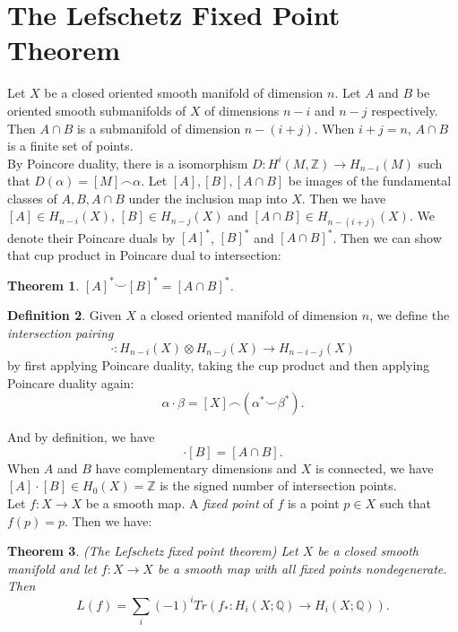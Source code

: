 \documentclass[psamsfonts]{amsart}
\newtheorem{theorem}{Theorem}[section]
\theoremstyle{definition}
\newtheorem{defn}[theorem]{Definition}
\theoremstyle{remark}
\numberwithin{equation}{section}
\begin{document}
	\section{The Lefschetz Fixed Point Theorem}
		Let $X$ be a closed oriented smooth manifold of dimension $n$. Let $A$ and $B$ be oriented smooth submanifolds of $X$ of dimensions $n-i$ and $n-j$ respectively. Then $A \cap B$ is a submanifold of dimension $n-(i+j)$. When $i+j = n$, $A \cap B$ is a finite set of points.\\
		\indent By Poincore duality, there is a isomorphism $D: H^i(M,\mathbb{Z}) \to H_{n-i}(M)$ such that $D(\alpha) = [M] \frown \alpha$.
		Let $[A],[B],[A \cap B]$ be images of the fundamental classes of $A,B,A \cap B$ under the inclusion map into $X$. Then we have $[A] \in H_{n-i}(X)$, $[B] \in H_{n-j}(X)$ and $[A \cap B] \in H_{n-(i+j)}(X)$. We denote their Poincare duals by $[A]^*$, $[B]^*$ and $[A \cap B]^*$. Then we can show that cup product in Poincare dual to intersection:
		\begin{theorem}
			$[A]^* \smile [B]^* = [A \cap B]^*$.
		\end{theorem}
		\begin{defn}
			Given $X$ a closed oriented manifold of dimension $n$, we define the \textit{intersection pairing}
			\begin{equation}
				\cdot: H_{n-i}(X) \otimes H_{n-j}(X) \to H_{n-i-j}(X)
			\end{equation}
			by first applying Poincare duality, taking the cup product and then applying Poincare duality again:
			\begin{equation}
				\alpha \cdot \beta = [X] \frown (\alpha^* \smile \beta^*).
			\end{equation}
		\end{defn}
		And by definition, we have
		\begin{equation}
			[A] \cdot [B] = [A \cap B].
		\end{equation}
		When $A$ and $B$ have complementary dimensions and $X$ is connected, we have $[A] \cdot [B] \in H_0(X) = \mathbb{Z}$ is the signed number of intersection points.\\
		\indent Let $f: X \to X$ be a smooth map. A \textit{fixed point} of $f$ is a point $p \in X$ such that $f(p) = p$. Then we have:
		\begin{theorem}(The Lefschetz fixed point theorem)
			Let $X$ be a closed smooth manifold and let $f: X \to X$ be a smooth map with all fixed points nondegenerate. Then
			\begin{equation}
				L(f) = \sum_{i} (-1)^i Tr(f_*: H_i(X;\mathbb{Q}) \to H_i(X;\mathbb{Q})).
			\end{equation}
		\end{theorem}
\end{document}
